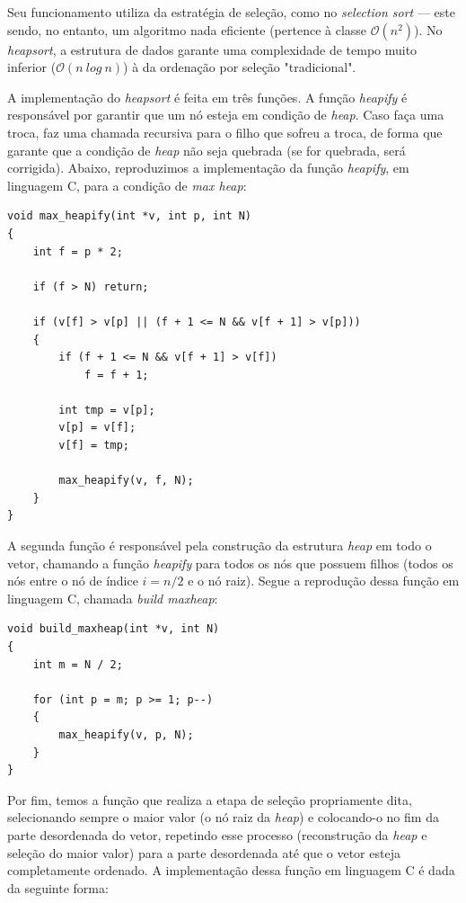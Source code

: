 \documentclass[fontsize=10pt]{article}
\begin{document}
\quad Seu funcionamento utiliza da estratégia de seleção, como no \textit{selection sort} — este sendo, no entanto, um algoritmo nada eficiente (pertence à classe $\mathcal{O}(n^2)$). No \textit{heapsort}, a estrutura de dados garante uma complexidade de tempo muito inferior ($\mathcal{O}(n\ log\ n)$) à da ordenação por seleção "tradicional".

\quad A implementação do \textit{heapsort} é feita em três funções.
A função \textit{heapify} é responsável por garantir que um nó esteja em condição de \textit{heap}. Caso faça uma troca, faz uma chamada recursiva para o filho que sofreu a troca, de forma que garante que a condição de \textit{heap} não seja quebrada (se for quebrada, será corrigida). Abaixo, reproduzimos a implementação da função \textit{heapify}, em linguagem C, para a condição de \textit{max heap}:

\begin{lstlisting}
void max_heapify(int *v, int p, int N)
{
    int f = p * 2;

    if (f > N) return;

    if (v[f] > v[p] || (f + 1 <= N && v[f + 1] > v[p]))
    {
        if (f + 1 <= N && v[f + 1] > v[f])
            f = f + 1;

        int tmp = v[p];
        v[p] = v[f];
        v[f] = tmp;

        max_heapify(v, f, N);
    }
}
\end{lstlisting}

\quad A segunda função é responsável pela construção da estrutura \textit{heap} em todo o vetor, chamando a função \textit{heapify} para todos os nós que possuem filhos (todos os nós entre o nó de índice $i = n/2$ e o nó raiz). Segue a reprodução dessa função em linguagem C, chamada \textit{build maxheap}:

\begin{lstlisting}
void build_maxheap(int *v, int N)
{
    int m = N / 2;

    for (int p = m; p >= 1; p--)
    {
        max_heapify(v, p, N);
    }
}
\end{lstlisting}

\quad Por fim, temos a função que realiza a etapa de seleção propriamente dita, selecionando sempre o maior valor (o nó raiz da \textit{heap}) e colocando-o no fim da parte desordenada do vetor, repetindo esse processo (reconstrução da \textit{heap} e seleção do maior valor) para a parte desordenada até que o vetor esteja completamente ordenado. A implementação dessa função em linguagem C é dada da seguinte forma: 
\end{document}
